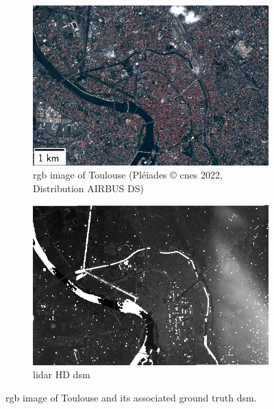 \begin{figure}
    \centering
    \begin{subfigure}[t]{0.48\linewidth}
        \flushleft
        \includegraphics[width=\linewidth]{Images/Chap_6/miniature_Toulouse.png}
        \caption{\acrshort{rgb} image of Toulouse (Pléiades © \acrshort{cnes} 2022, Distribution AIRBUS DS)}
        \label{fig:miniature_Toulouse_rgb}
    \end{subfigure}\hfill
    \begin{subfigure}[t]{0.48\linewidth}
        \flushright
        \includegraphics[width=\linewidth]{Images/Chap_6/miniature_Toulouse_gt.png}
        \caption{\acrshort{lidar} HD \acrshort{dsm}}
        \label{fig:miniature_Toulouse_gt}
    \end{subfigure}
    \caption{\acrshort{rgb} image of Toulouse and its associated ground truth \acrshort{dsm}.}
    \label{fig:miniature_Toulouse}
\end{figure}

